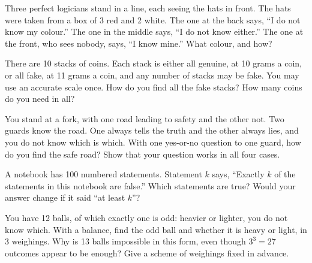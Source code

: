 \begin{question}\label{iq:iv1:logic-riddles:23}
Three perfect logicians stand in a line, each seeing the hats in front. The hats were taken from a box of 3 red and 2 white. The one at the back says, ``I do not know my colour.'' The one in the middle says, ``I do not know either.'' The one at the front, who sees nobody, says, ``I know mine.'' What colour, and how?
\end{question}

\begin{question}\label{iq:iv1:logic-riddles:24}
There are 10 stacks of coins. Each stack is either all genuine, at 10 grams a coin, or all fake, at 11 grams a coin, and any number of stacks may be fake. You may use an accurate scale once. How do you find all the fake stacks? How many coins do you need in all?
\end{question}

\begin{question}\label{iq:iv1:logic-riddles:25}
You stand at a fork, with one road leading to safety and the other not. Two guards know the road. One always tells the truth and the other always lies, and you do not know which is which. With one yes-or-no question to one guard, how do you find the safe road? Show that your question works in all four cases.
\end{question}

\begin{question}\label{iq:iv1:logic-riddles:26}
A notebook has 100 numbered statements. Statement $k$ says, ``Exactly $k$ of the statements in this notebook are false.'' Which statements are true? Would your answer change if it said ``at least $k$''?
\end{question}

\begin{question}\label{iq:iv1:logic-riddles:27}
You have 12 balls, of which exactly one is odd: heavier or lighter, you do not know which. With a balance, find the odd ball and whether it is heavy or light, in 3 weighings. Why is 13 balls impossible in this form, even though $3^3 = 27$ outcomes appear to be enough? Give a scheme of weighings fixed in advance.
\end{question}

